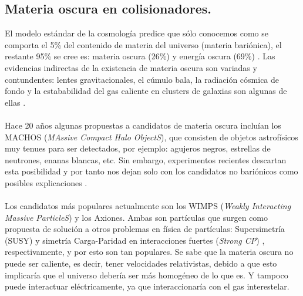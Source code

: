 \subsection{Materia oscura en colisionadores.}

El modelo estándar de la cosmología predice que sólo conocemos como se comporta el 5\% del contenido de materia del universo (materia bariónica), el restante 95\% se cree es: materia oscura (26\%) y energía oscura (69\%) \cite{Ade:2015xua}. Las evidencias indirectas de la existencia de materia oscura son variadas y contundentes: lentes gravitacionales, el cúmulo bala, la radiación cósmica de fondo y la estababilidad del gas caliente en clusters de galaxias son algunas de ellas \cite{Freese:2017idy}. 
\\
\\
Hace 20 años algunas propuestas a candidatos de materia oscura incluían los MACHOS (\textit{MAssive Compact Halo ObjectS}), que consisten de objetos astrofísicos muy tenues para ser detectados, por ejemplo: agujeros negros, estrellas de neutrones, enanas blancas, etc. Sin embargo, experimentos recientes descartan esta posibilidad y por tanto nos dejan solo con los candidatos no bariónicos como posibles explicaciones \cite{Freese:1999ge,Fields:1999ar}.
\\
\\
Los candidatos más populares actualmente son los WIMPS (\textit{Weakly Interacting Massive ParticleS}) y los Axiones. Ambas son partículas que surgen como propuesta de solución a otros problemas en física de partículas: Supersimetría (SUSY) \cite{SUSY} y simetría Carga-Paridad en interacciones fuertes (\textit{Strong CP}) \cite{StrongCP}, respectivamente, y por esto son tan populares. Se sabe que la materia oscura no puede ser caliente, es decir, tener velocidades relativistas, debido a que esto implicaría que el universo debería ser más homogéneo de lo que es. Y tampoco puede interactuar eléctricamente, ya que interaccionaría con el gas interestelar. 
\\
\\
